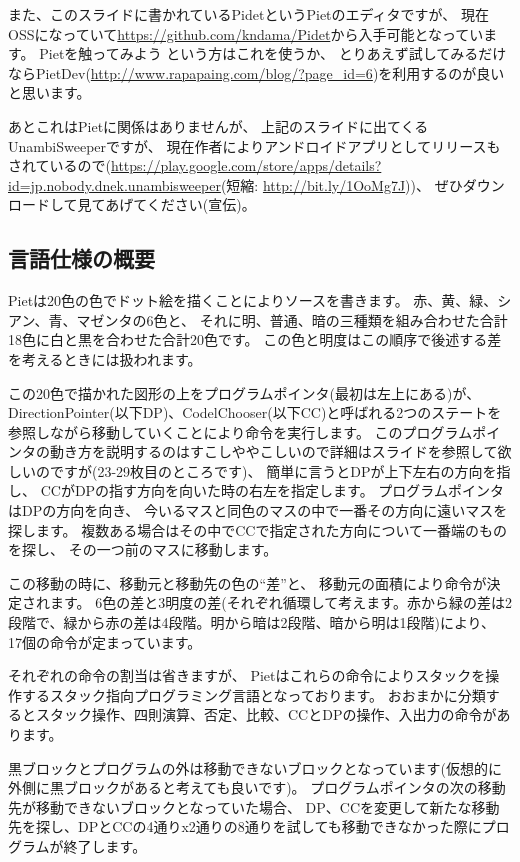 また、このスライドに書かれているPidetというPietのエディタですが、
現在OSSになっていて\url{https://github.com/kndama/Pidet}から入手可能となっています。
Pietを触ってみよう という方はこれを使うか、
とりあえず試してみるだけならPietDev(\url{http://www.rapapaing.com/blog/?page\_id=6})を利用するのが良いと思います。

あとこれはPietに関係はありませんが、
上記のスライドに出てくるUnambiSweeperですが、
現在作者によりアンドロイドアプリとしてリリースもされているので(\url{https://play.google.com/store/apps/details?id=jp.nobody.dnek.unambisweeper}(短縮: \url{http://bit.ly/1OoMg7J}))、
ぜひダウンロードして見てあげてください(宣伝)。

\subsection{言語仕様の概要}

Pietは20色の色でドット絵を描くことによりソースを書きます。
赤、黄、緑、シアン、青、マゼンタの6色と、
それに明、普通、暗の三種類を組み合わせた合計18色に白と黒を合わせた合計20色です。
この色と明度はこの順序で後述する差を考えるときには扱われます。

この20色で描かれた図形の上をプログラムポインタ(最初は左上にある)が、
DirectionPointer(以下DP)、CodelChooser(以下CC)と呼ばれる2つのステートを参照しながら移動していくことにより命令を実行します。
このプログラムポインタの動き方を説明するのはすこしややこしいので詳細はスライドを参照して欲しいのですが(23-29枚目のところです)、
簡単に言うとDPが上下左右の方向を指し、
CCがDPの指す方向を向いた時の右左を指定します。
プログラムポインタはDPの方向を向き、
今いるマスと同色のマスの中で一番その方向に遠いマスを探します。
複数ある場合はその中でCCで指定された方向について一番端のものを探し、
その一つ前のマスに移動します。

この移動の時に、移動元と移動先の色の``差''と、
移動元の面積により命令が決定されます。
6色の差と3明度の差(それぞれ循環して考えます。赤から緑の差は2段階で、緑から赤の差は4段階。明から暗は2段階、暗から明は1段階)により、
17個の命令が定まっています。

それぞれの命令の割当は省きますが、
Pietはこれらの命令によりスタックを操作するスタック指向プログラミング言語となっております。
おおまかに分類するとスタック操作、四則演算、否定、比較、CCとDPの操作、入出力の命令があります。

黒ブロックとプログラムの外は移動できないブロックとなっています(仮想的に外側に黒ブロックがあると考えても良いです)。
プログラムポインタの次の移動先が移動できないブロックとなっていた場合、
DP、CCを変更して新たな移動先を探し、DPとCCの4通りx2通りの8通りを試しても移動できなかった際にプログラムが終了します。

